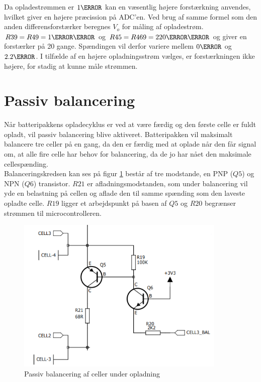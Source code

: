 Da opladestrømmen er $1\ampere$ kan en væsentlig højere forstærkning anvendes, hvilket giver en højere præcission på ADC'en. Ved brug af samme formel som den anden differensforstærker beregnes $V_{o}$ for måling af opladestrøm. $R39 = R49 = 1\kilo\ohm$ og $R45 = R469 = 220\kilo\ohm$ og giver en forstærker på 20 gange. Spændingen vil derfor variere mellem $0\volt$ og $2.2\volt$. I tilfælde af en højere opladningsstrøm vælges, er forstærkningen ikke højere, for stadig at kunne måle strømmen.


\section{Passiv balancering}\label{afs:balancing}
Når batteripakkens opladecyklus er ved at være færdig og den første celle er fuldt opladt, vil passiv balancering blive aktiveret. Batteripakken vil maksimalt balancere tre celler på en gang, da den er færdig med at oplade når den får signal om, at alle fire celle har behov for balancering, da de jo har nået den maksimale cellespænding.
\\

Balanceringskredsen kan ses på figur \ref{fig:passiv_balancering} består af tre modstande, en PNP ($Q5$) og NPN ($Q6$) transistor. $R21$ er afladningsmodstanden, som under balancering vil yde en belastning på cellen og aflade den til samme spænding som den laveste opladte celle. $R19$ ligger et arbejdspunkt på basen af $Q5$ og $R20$ begrænser strømmen til microcontrolleren. 
\\

\begin{figure}[h]
	\centering
	\includegraphics[width=10cm]{billeder/balance.png}
	\caption{Passiv balancering af celler under opladning}
	\label{fig:passiv_balancering}
\end{figure}

